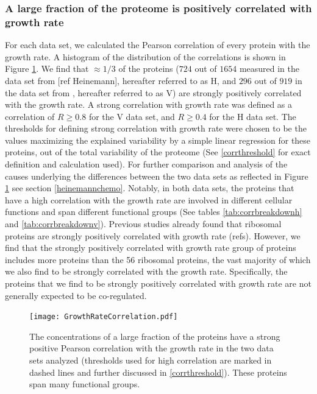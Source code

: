 \documentclass[notitlepage]{article}
\begin{document}
\subsubsection{A large fraction of the proteome is positively correlated with growth rate}
For each data set, we calculated the Pearson correlation of every protein with the growth rate.
A histogram of the distribution of the correlations is shown in Figure \ref{fig:growthcorr}.
We find that $\approx 1/3$ of the proteins ($724$ out of $1654$ measured in the data set from [ref Heinemann], hereafter referred to as H, and $296$ out of $919$ in the data set from \cite{Valgepea2013}, hereafter referred to as V) are strongly positively correlated with the growth rate.
A strong correlation with growth rate was defined as a correlation of $R\geq 0.8$ for the V data set, and $R\geq 0.4$ for the H data set.
The thresholds for defining strong correlation with growth rate were chosen to be the values maximizing the explained variability by a simple linear regression for these proteins, out of the total variability of the proteome (See \ref{corrthreshold} for exact definition and calculation used).
For further comparison and analysis of the causes underlying the differences between the two data sets as reflected in Figure \ref{fig:growthcorr} see section \ref{heinemannchemo}.
Notably, in both data sets, the proteins that have a high correlation with the growth rate are involved in different cellular functions and span different functional groups (See tables \ref{tab:corrbreakdownh} and \ref{tab:corrbreakdownv}).
Previous studies already found that ribosomal proteins are strongly positively correlated with growth rate (refs).
However, we find that the strongly positively correlated with growth rate group of proteins includes more proteins than the 56 ribosomal proteins, the vast majority of which we also find to be strongly correlated with the growth rate.
Specifically, the proteins that we find to be strongly positively correlated with growth rate are not generally expected to be co-regulated.

\begin{figure}[h]
\centering
\texttt{[image: GrowthRateCorrelation.pdf]}
\caption{
The concentrations of a large fraction of the proteins have a strong positive Pearson correlation with the growth rate in the two data sets analyzed (thresholds used for high correlation are marked in dashed lines and further discussed in \ref{corrthreshold}).
These proteins span many functional groups.
}
\label{fig:growthcorr}
\end{figure}
\end{document}

